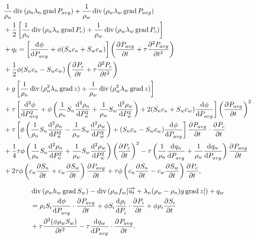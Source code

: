 \begin{equation} \label{eq:full_pressure}
 \begin{aligned}
  & \frac{1}{\rho_n} \diver{ (\rho_n\lambda_n\grad{ P_{avg}})} + \frac{1}{\rho_w} \diver{ (\rho_w\lambda_w\grad{ P_{avg}})}  \\
  & + \frac{1}{2} \left[ \frac{1}{\rho_n} \diver{ (\rho_n\lambda_n\grad{ P_c})} + \frac{1}{\rho_w} \diver{ (\rho_w\lambda_w\grad{ P_c})} \right]  \\
  & + q_t = \left[ \dd{\phi}{P_{avg}} + \phi (S_n c_n + S_w c_w) \right] \left( \pd{P_{avg}}{t} + \tau \pd[2]{P_{avg}}{t} \right) \\
  & + \frac{1}{2} \phi (S_n c_n - S_w c_w) \left( \pd{P_{c}}{t} + \tau \pd[2]{P_c}{t} \right) \\
  & + g \left[ \frac{1}{\rho_n} \diver{ (\rho_n^2\lambda_n\grad{ z})} + \frac{1}{\rho_w} \diver{ (\rho_w^2\lambda_w\grad{ z})} \right]  \\
  & + \tau \left[ \dd[2]{\phi}{P_{avg}} + \phi \left( \frac{1}{\rho_n} S_n \dd[2]{\rho_n}{P_n} + \frac{1}{\rho_w} S_w \dd[2]{\rho_w}{P_w} \right)
  + 2(S_n c_n + S_w c_w) \dd{\phi}{P_{avg}} \right] {\left( \pd{P_{avg}}{t}\right) }^2 \\
  & + \tau \left[ \phi \left( \frac{1}{\rho_n} S_n \dd[2]{\rho_n}{P_n} - \frac{1}{\rho_w} S_w \dd[2]{\rho_w}{P_w} \right) 
  + (S_n c_n - S_w c_w) \dd{\phi}{P_{avg}} \right] \pd{P_{avg}}{t} \cdot \pd{P_c}{t} \\
  & + \frac{1}{4} \tau \phi \left( \frac{1}{\rho_n} S_n \dd[2]{\rho_n}{P_n} + \frac{1}{\rho_w} S_w \dd[2]{\rho_w}{P_w} \right) {\left( \pd{P_c}{t}\right) }^2 
  - \tau \left(\frac{1}{\rho_n}\dd{q_n}{P_{avg}} + \frac{1}{\rho_w}\dd{q_w}{P_{avg}}\right) \pd{P_{avg}}{t} \\
  & + 2 \tau \phi \left(c_n \pd{S_n}{t} + c_w \pd{S_w}{t} \right) \pd{P_{avg}}{t}+ \tau \phi \left(c_n \pd{S_n}{t} - c_w \pd{S_w}{t} \right) \pd{P_c}{t},
 \end{aligned}
\end{equation}

\begin{equation} \label{eq:full_saturation}
 \begin{aligned}
  &\diver{(\rho_w h_w \grad{ S_w})} - \diver{(\rho_w f_w[\overrightarrow{u_t} + \lambda_n(\rho_w - \rho_n)g \grad{ z}])} + q_w \\
  & = \rho_i S_i \dd{\phi}{P_{avg}} \cdot \pd{P_{avg}}{t}
 + \phi S_i \dd{\rho_i}{P_i} \cdot \pd{P_i}{t} + \phi \rho_i \pd{S_i}{t} \\
  & + \tau \pd[2]{(\phi \rho_w S_w)}{t} - \tau \dd{q_w}{P_{avg}} \cdot \pd{P_{avg}}{t}.
 \end{aligned}
\end{equation} 

